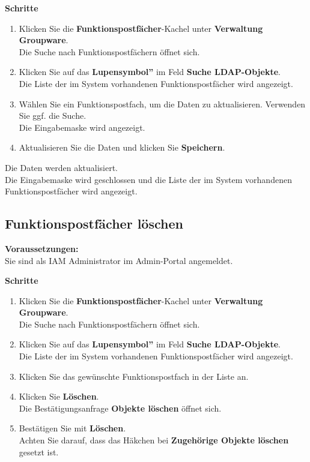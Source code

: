 \documentclass[
  letterpaper,
  DIV=11,
  numbers=noendperiod]{scrreprt}
\providecommand{\tightlist}{%
  \setlength{\itemsep}{0pt}\setlength{\parskip}{0pt}}\usepackage{longtable,booktabs,array}
\begin{document}
\textbf{Schritte}

\begin{enumerate}
\def\labelenumi{\arabic{enumi}.}
\tightlist
\item
  Klicken Sie die \textbf{Funktionspostfächer}-Kachel unter
  \textbf{Verwaltung Groupware}.\\
  Die Suche nach Funktionspostfächern öffnet sich.\\
\item
  Klicken Sie auf das \textbf{Lupensymbol''} im Feld \textbf{Suche
  LDAP-Objekte}.\\
  Die Liste der im System vorhandenen Funktionspostfächer wird
  angezeigt.\\
\item
  Wählen Sie ein Funktionspostfach, um die Daten zu aktualisieren.
  Verwenden Sie ggf. die Suche.\\
  Die Eingabemaske wird angezeigt.\\
\item
  Aktualisieren Sie die Daten und klicken Sie \textbf{Speichern}.
\end{enumerate}

Die Daten werden aktualisiert.\\
Die Eingabemaske wird geschlossen und die Liste der im System
vorhandenen Funktionspostfächer wird angezeigt.

\subsection{Funktionspostfächer
löschen}\label{funktionspostfuxe4cher-luxf6schen}

\textbf{Voraussetzungen:}\\
Sie sind als IAM Administrator im Admin-Portal angemeldet.

\textbf{Schritte}

\begin{enumerate}
\def\labelenumi{\arabic{enumi}.}
\tightlist
\item
  Klicken Sie die \textbf{Funktionspostfächer}-Kachel unter
  \textbf{Verwaltung Groupware}.\\
  Die Suche nach Funktionspostfächern öffnet sich.\\
\item
  Klicken Sie auf das \textbf{Lupensymbol''} im Feld \textbf{Suche
  LDAP-Objekte}.\\
  Die Liste der im System vorhandenen Funktionspostfächer wird
  angezeigt.\\
\item
  Klicken Sie das gewünschte Funktionspostfach in der Liste an.\\
\item
  Klicken Sie \textbf{Löschen}.\\
  Die Bestätigungsanfrage \textbf{Objekte löschen} öffnet sich.
\item
  Bestätigen Sie mit \textbf{Löschen}.\\
  Achten Sie darauf, dass das Häkchen bei \textbf{Zugehörige Objekte
  löschen} gesetzt ist.
\end{enumerate}
\end{document}
